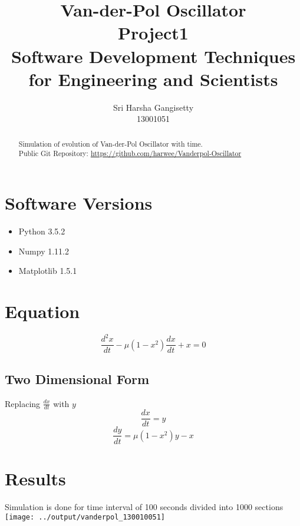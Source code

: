 \documentclass[a4paper]{article}
\title{Van-der-Pol Oscillator\\
			\large Project1 \\
			\large Software Development Techniques for Engineering and Scientists}
\author{Sri Harsha Gangisetty \\
					13001051}
\begin{document}
\maketitle

\begin{abstract}
Simulation of evolution of Van-der-Pol Oscillator with time. \\

Public Git Repository: \href{https://github.com/harwee/Vanderpol-Oscillator}{https://github.com/harwee/Vanderpol-Oscillator}

\end{abstract}

\section{Software Versions}

\begin{itemize}
\item Python 3.5.2
\item Numpy 1.11.2
\item Matplotlib 1.5.1
\end{itemize}
\section{Equation}

\begin{equation}
\frac{d^2x}{dt}-\mu (1-x^2) \frac{dx}{dt} + x = 0
\end{equation}
\subsection{Two Dimensional Form}

	Replacing $ \frac{dx}{dt} $ with $ y $ \\
	\begin{equation}
	\frac{dx}{dt} = y
	\end{equation}
    \begin{equation}
	\frac{dy}{dt} = \mu (1-x^2)y -x
	\end{equation}
\newpage
\section{Results}
	Simulation is done for time interval of 100 seconds divided into 1000 sections
\centering
\texttt{[image: ../output/vanderpol\_130010051]}
\end{document}
